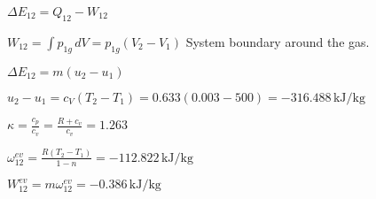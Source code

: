 \( \Delta E_{12} = Q_{12} - W_{12} \)  

\( W_{12} = \int p_{1g} \, dV = p_{1g} (V_2 - V_1) \)  
System boundary around the gas.  

\( \Delta E_{12} = m (u_2 - u_1) \)  

\( u_2 - u_1 = c_V (T_2 - T_1) = 0.633 (0.003 - 500) = -316.488 \, \text{kJ/kg} \)  

\( \kappa = \frac{c_p}{c_v} = \frac{R + c_v}{c_v} = 1.263 \)  

\( \omega_{12}^{ev} = \frac{R (T_2 - T_1)}{1 - n} = -112.822 \, \text{kJ/kg} \)  

\( W_{12}^{ev} = m \omega_{12}^{ev} = -0.386 \, \text{kJ/kg} \)